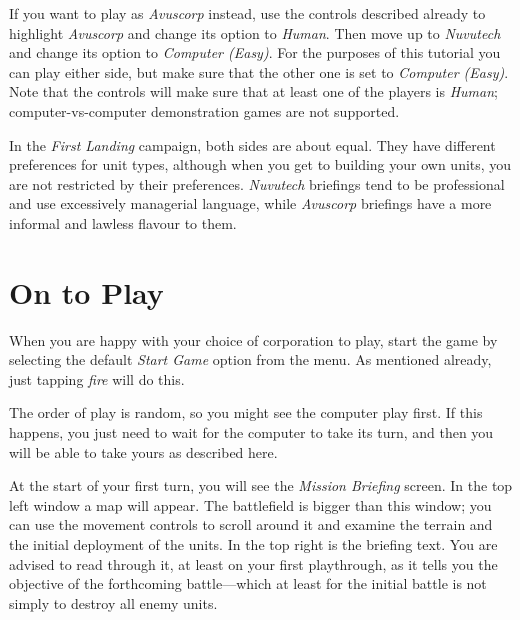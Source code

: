 If you want to play as {\it Avuscorp} instead, use the controls described already to highlight {\it Avuscorp} and change its option to {\it Human}. Then move up to {\it Nuvutech} and change its option to {\it Computer (Easy)}. For the purposes of this tutorial you can play either side, but make sure that the other one is set to {\it Computer (Easy)}. Note that the controls will make sure that at least one of the players is {\it Human}; computer-vs-computer demonstration games are not supported.

In the {\it First Landing} campaign, both sides are about equal. They have different preferences for unit types, although when you get to building your own units, you are not restricted by their preferences. {\it Nuvutech} briefings tend to be professional and use excessively managerial language, while {\it Avuscorp} briefings have a more informal and lawless flavour to them.

\section {On to Play}

\noindent
When you are happy with your choice of corporation to play, start the game by selecting the default {\it Start Game} option from the menu. As mentioned already, just tapping {\it fire} will do this.

The order of play is random, so you might see the computer play first. If this happens, you just need to wait for the computer to take its turn, and then you will be able to take yours as described here.

At the start of your first turn, you will see the {\it Mission Briefing} screen. In the top left window a map will appear. The battlefield is bigger than this window; you can use the movement controls to scroll around it and examine the terrain and the initial deployment of the units. In the top right is the briefing text. You are advised to read through it, at least on your first playthrough, as it tells you the objective of the forthcoming battle---which at least for the initial battle is not simply to destroy all enemy units.

